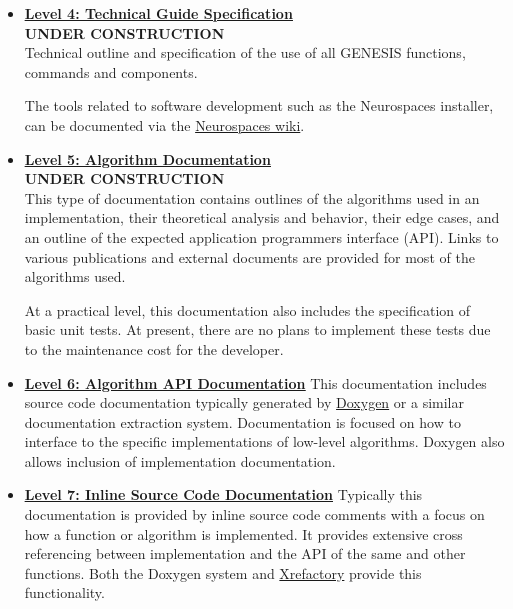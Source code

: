 \documentclass[12pt]{article}
\begin{document}
\begin{itemize}
\item[]\href{../contents-level4/contents-level4.tex}{\bf \underline{Level 4: Technical Guide Specification}}\\
  {\bf UNDER CONSTRUCTION}\\
  Technical outline and specification of the use of all GENESIS
  functions, commands and components.

  The tools related to software development such as the Neurospaces
  installer, can be documented via the
  \href{http://code.google.com/p/neurospaces/wiki/Index}{Neurospaces
    wiki}.

\item[]\href{../contents-level5/contents-level5.tex}{\bf \underline{Level 5: Algorithm Documentation}} \\
  {\bf UNDER CONSTRUCTION}\\
  This type of documentation contains outlines of the algorithms used
  in an implementation, their theoretical analysis and behavior, their
  edge cases, and an outline of the expected application programmers
  interface (API).  Links to various publications and external
  documents are provided for most of the algorithms used.

  At a practical level, this documentation also includes the
  specification of basic unit tests.  At present, there are no plans
  to implement these tests due to the maintenance cost for the
  developer.

\item[]\href{http://neurospaces.sourceforge.net/doxygen-menu.html}{\bf \underline{Level 6: Algorithm API Documentation}}
  This documentation includes source code documentation typically
  generated by \href{http://www.stack.nl/~dimitri/doxygen/}{Doxygen}
  or a similar documentation extraction system.  Documentation is
  focused on how to interface to the specific implementations of
  low-level algorithms. Doxygen also allows inclusion of
  implementation documentation.

\item[]\href{http://neurospaces.sourceforge.net/cxref-menu.html}{\bf \underline{Level 7: Inline Source Code Documentation}}
  Typically this documentation is provided by inline source code
  comments with a focus on how a function or algorithm is implemented.
  It provides extensive cross referencing between implementation and
  the API of the same and other functions.
  Both the Doxygen system and \href {http://www.xref.sk/xrefactory/main.html}{Xrefactory} provide this
  functionality.
  

\end{itemize}
\end{document}
